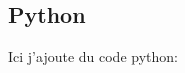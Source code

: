 \documentclass[a4paper,11pt]{article}
\begin{document}
\subsection{Python}
Ici j'ajoute du code python:\par







\end{document}
